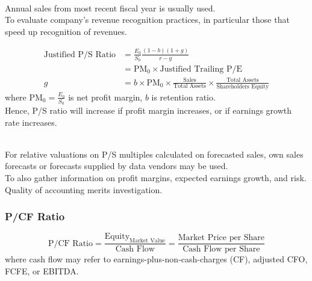 \begin{remark} \\
Annual sales from most recent fiscal year is usually used.\\
To evaluate company's revenue recognition practices, in particular those that speed up recognition of revenues.
\end{remark}

\begin{definition} 
\begin{align}
\text{Justified P/S Ratio} &= \frac{E_0}{S_0} \frac{(1-b)(1+g)}{r-g} \nonumber \\
&= \text{PM}_0 \times \text{Justified Trailing P/E} \nonumber \\
g &= b \times \text{PM}_0 \times \frac{\text{Sales}}{\text{Total Assets}} \times \frac{\text{Total Assets}}{\text{Shareholders Equity}} \nonumber
\end{align}
where PM$_0 = \frac{E_0}{S_0}$ is net profit margin, $b$ is retention ratio.\\
Hence, P/S ratio will increase if profit margin increases, or if earnings growth rate increases.
\end{definition}

\begin{remark} \\
For relative valuations on P/S multiples calculated on forecasted sales, own sales forecasts or forecasts supplied by data vendors may be used.\\
To also gather information on profit margins, expected earnings growth, and risk.\\
Quality of accounting merits investigation.
\end{remark}

\subsubsection{P/CF Ratio}

\begin{definition} 
\begin{equation}
\text{P/CF Ratio} = \frac{\text{Equity}_{\text{Market Value}}}{\text{Cash Flow}} = \frac{\text{Market Price per Share}}{\text{Cash Flow per Share}} \nonumber
\end{equation}
where cash flow may refer to earnings-plus-non-cash-charges (CF), adjusted CFO, FCFE, or EBITDA.
\end{definition}

